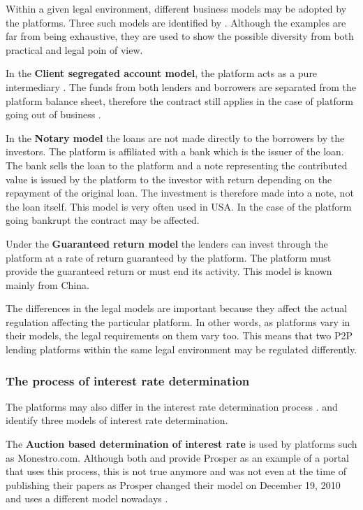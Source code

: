 Within a given legal environment, different business models may be adopted by the platforms. Three such models are identified by \cite{Kirby2014}. Although the examples are far from being exhaustive, they are used to show the possible diversity from both practical and legal poin of view.

In the \textbf{Client segregated account model}, the platform acts as a pure intermediary \cite[]{Fong2015}. The funds from both lenders and borrowers are separated from the platform balance sheet, therefore the contract still applies in the case of platform going out of business \cite[]{Kirby2014}.

In the \textbf{Notary model} the loans are not made directly to the borrowers by the investors. The platform is affiliated with a bank which is the issuer of the loan. The bank sells the loan to the platform and a note representing the contributed value is issued by the platform to the investor with return depending on the repayment of the original loan. The investment is therefore made into a note, not the loan itself. This model is very often used in USA. \cite[]{Chaffee2012, Fong2015, Kirby2014} In the case of the platform going bankrupt the contract may be affected.

Under the \textbf{Guaranteed return model} the lenders can invest through the platform at a rate of return guaranteed by the platform. The platform must provide the guaranteed return or must end its activity. This model is known mainly from China. \cite[]{Kirby2014}

The differences in the legal models are important because they affect the actual regulation affecting the particular platform. In other words, as platforms vary in their models, the legal requirements on them vary too. This means that two P2P lending platforms within the same legal environment may be regulated differently. \cite[]{Jorgensen2018}

\subsubsection{The process of interest rate determination}

The platforms may also differ in the interest rate determination process \cite[]{Bachmann2011}. \cite{Vysusil2016} and \cite{wiseclerk2013} identify three models of interest rate determination.

The \textbf{Auction based determination of interest rate} is used by platforms such as Monestro.com. Although both \cite{Vysusil2016} and \cite{Bachmann2011} provide Prosper as an example of a portal that uses this process, this is not true anymore and was not even at the time of publishing their papers as Prosper changed their model on December 19, 2010 and uses a different model nowadays \cite[]{Renton2012}.

